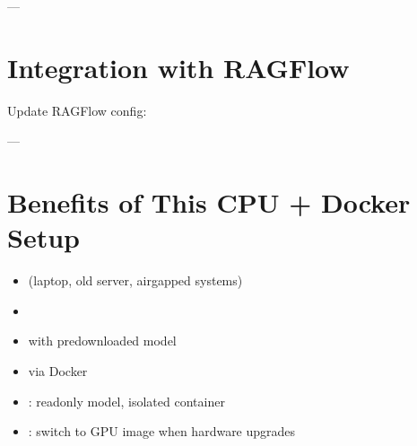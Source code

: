 \documentclass[letterpaper,10pt,english]{sphinxmanual}
\begin{document}
\sphinxAtStartPar
—


\section{Integration with RAGFlow}
\label{\detokenize{vllm-cpu:integration-with-ragflow}}
\sphinxAtStartPar
Update RAGFlow config:

\begin{sphinxVerbatim}[commandchars=\\\{\}]
\end{sphinxVerbatim}

\sphinxAtStartPar
—


\section{Benefits of This CPU + Docker Setup}
\label{\detokenize{vllm-cpu:benefits-of-this-cpu-docker-setup}}\begin{itemize}
\item {} 
\sphinxAtStartPar
{} (laptop, old server, air\sphinxhyphen{}gapped systems)

\item {} 
\sphinxAtStartPar
{}

\item {} 
\sphinxAtStartPar
{} with pre\sphinxhyphen{}downloaded model

\item {} 
\sphinxAtStartPar
{} via Docker

\item {} 
\sphinxAtStartPar
{}: read\sphinxhyphen{}only model, isolated container

\item {} 
\sphinxAtStartPar
{}: switch to GPU image when hardware upgrades

\end{itemize}

\sphinxAtStartPar
{}
\end{document}
